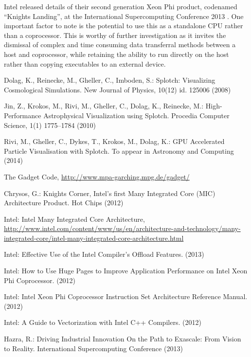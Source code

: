 \documentclass[runningheads,a4paper]{llncs}
\begin{document}
Intel released details of their second generation Xeon Phi product, codenamed “Knights Landing”,  at the International Supercomputing 
Conference 2013 \cite{knightlanding}. One important factor to note is the potential to use this as a standalone CPU rather than a coprocessor. 
This is worthy of further investigation as it invites the dismissal of complex and time consuming data transferral methods between 
a host and coprocessor, while retaining the ability to run directly on the host rather than copying executables to an external device.

\begin{thebibliography}{4}

Dolag, K., Reinecke, M., Gheller, C., Imboden, S.: Splotch: Visualizing Cosmological Simulations. New Journal of Physics, 10(12)  id. 125006 (2008)

Jin, Z., Krokos, M., Rivi, M., Gheller, C., Dolag, K., Reinecke, M.: High-Performance Astrophysical Visualization using Splotch. 
  Procedia Computer Science, 1(1) 1775--1784 (2010)

Rivi, M., Gheller, C., Dykes, T., Krokos, M., Dolag, K.:  GPU Accelerated
  Particle Visualisation with Splotch. To appear in Astronomy and Computing (2014)
 
The Gadget Code, \url{http://www.mpa-garching.mpg.de/gadget/}  
  
Chrysos, G.: Knights Corner, Intel's first Many Integrated Core (MIC) Architecture Product. 
  Hot Chips (2012) 

Intel: Intel Many Integrated Core Architecture, 
  \url{http://www.intel.com/content/www/us/en/architecture-and-technology/many-integrated-core/intel-many-integrated-core-architecture.html}

 Intel: Effective Use of the Intel Compiler's Offload Features. (2013)

Intel: How to Use Huge Pages to Improve Application Performance on Intel Xeon Phi Coprocessor. (2012)

Intel: Intel Xeon Phi Coprocessor Instruction Set Architecture Reference Manual. (2012)

Intel: A Guide to Vectorization with Intel C++ Compilers. (2012)

Hazra, R.: Driving Industrial Innovation On the Path to Exascale: From Vision to Reality. 
  International Supercomputing Conference (2013)

\end{thebibliography}
\end{document}

